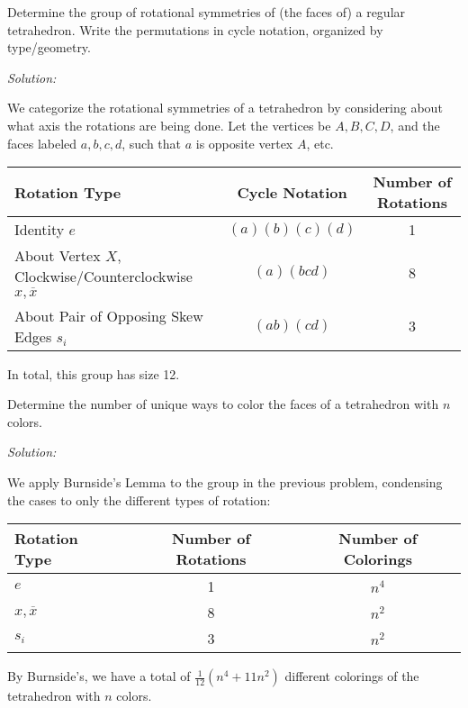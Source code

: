 \documentclass[12pt]{scrartcl}
\newenvironment{problem}[2][Problem]{\begin{trivlist}
\item[\hskip \labelsep {\bfseries #1}\hskip \labelsep {\bfseries #2.}]}{\end{trivlist}}
\newenvironment{solution}
    {\emph{Solution:}
    }
    {
    \qedhere
    }
\begin{document}
\begin{problem}{6} 
Determine the group of rotational symmetries of (the faces of) a regular tetrahedron. Write the permutations in cycle notation, organized by type/geometry. 

\end{problem}

\begin{solution}
We categorize the rotational symmetries of a tetrahedron by considering about what axis the rotations are being done. Let the vertices be $A, B, C, D$, and the faces labeled $a, b, c, d$, such that $a$ is opposite vertex $A$, etc.  
\begin{center}
\begin{tabular}{m{5cm}| c | c}
\centering Rotation Type & Cycle Notation & Number of Rotations \\ \hline 
\centering Identity $e$ & $(a)(b)(c)(d)$ & 1 \\ 
\centering About Vertex $X$, Clockwise/Counterclockwise $x, \overline{x}$ & $(a)(bcd)$ & 8 \\
\centering About Pair of Opposing Skew Edges $s_i$ & $(ab)(cd)$ & 3 \\
\end{tabular}
\end{center}
In total, this group has size 12.
\end{solution}

\begin{problem}{7} 
Determine the number of unique ways to color the faces of a tetrahedron with $n$ colors. 

\end{problem}

\begin{solution}
We apply Burnside's Lemma to the group in the previous problem, condensing the cases to only the different types of rotation: 
\begin{center}
\begin{tabular}{m{5cm}| c | c}
\centering Rotation Type & Number of Rotations & Number of Colorings \\ \hline 
\centering $e$ & 1 & $n^4$ \\ 
\centering $x, \overline{x}$ & 8 & $n^2$ \\
\centering $s_i$ & 3 & $n^2$ \\
\end{tabular}
\end{center} 

By Burnside's, we have a total of $\boxed{\frac{1}{12}(n^4 + 11n^2)}$ different colorings of the tetrahedron with $n$ colors. 
\end{solution}
\end{document}
